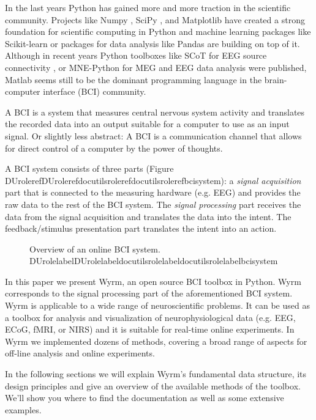 \documentclass[letterpaper,compsoc,twoside]{IEEEtran}
\providecommand*{\DUrole}[2]{\ifcsname DUrole#1\endcsname \csname DUrole#1\endcsname{#2}\else \ifcsname docutilsrole#1\endcsname \csname docutilsrole#1\endcsname{#2}\else #2\fi \fi }
\begin{document}
In the last years Python has gained more and more traction in the scientific
community. Projects like Numpy \cite{Numpy}, SciPy \cite{SciPy}, and Matplotlib
\cite{Matplotlib} have created a strong foundation for scientific computing in
Python and machine learning packages like Scikit-learn \cite{Scikit-learn} or
packages for data analysis like Pandas \cite{Pandas} are building on top of it.
Although in recent years Python toolboxes like SCoT for EEG source connectivity
\cite{Billinger}, or MNE-Python for MEG and EEG data analysis \cite{Gramfort} were
published, Matlab seems still to be the dominant programming language in the
brain-computer interface (BCI) community.

A BCI is a system that measures central nervous system activity and translates
the recorded data into an output suitable for a computer to use as an input
signal. Or slightly less abstract: A BCI is a communication channel that allows
for direct control of a computer by the power of thoughts.

A BCI system consists of three parts (Figure \DUrole{ref}{bcisystem}): a \emph{signal
acquisition} part that is connected to the measuring hardware (e.g. EEG) and
provides the raw data to the rest of the BCI system. The \emph{signal processing}
part receives the data from the signal acquisition and translates the data into
the intent. The feedback/stimulus presentation part translates the intent into
an action.\begin{figure}[]\noindent{}
\caption{Overview of an online BCI system.
\DUrole{label}{bcisystem}}
\end{figure}

In this paper we present Wyrm, an open source BCI toolbox in Python. Wyrm
corresponds to the signal processing part of the aforementioned BCI system. Wyrm
is applicable to a wide range of neuroscientific problems. It can be used as a
toolbox for analysis and visualization of neurophysiological data (e.g. EEG,
ECoG, fMRI, or NIRS) and it is suitable for real-time online experiments. In
Wyrm we implemented dozens of methods, covering a broad range of aspects for
off-line analysis and online experiments.

In the following sections we will explain Wyrm's fundamental data structure, its
design principles and give an overview of the available methods of the toolbox.
We'll show you where to find the documentation as well as some extensive
examples.
\end{document}
